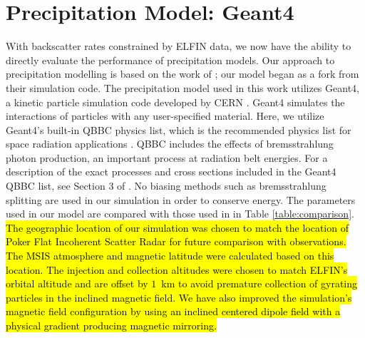 \documentclass[draft]{agujournal2019}
\begin{document}
\section{Precipitation Model: Geant4}
With backscatter rates constrained by ELFIN data, we now have the ability to directly evaluate the performance of precipitation models. Our approach to precipitation modelling is based on the work of ; our model began as a fork from their simulation code. The precipitation model used in this work utilizes Geant4, a kinetic particle simulation code developed by CERN \cite{agostinelli2003}. Geant4 simulates the interactions of particles with any user-specified material. Here, we utilize Geant4's built-in QBBC physics list, which is the recommended physics list for space radiation applications \cite{ivantchenko2012}. QBBC includes the effects of bremsstrahlung photon production, an important process at radiation belt energies. For a description of the exact processes and cross sections included in the Geant4 QBBC list, see Section 3 of . No biasing methods such as bremsstrahlung splitting are used in our simulation in order to conserve energy. The parameters used in our model are compared with those used in  in Table \ref{table:comparison}. \hl{The geographic location of our simulation was chosen to match the location of Poker Flat Incoherent Scatter Radar for future comparison with observations. The MSIS atmosphere and magnetic latitude were calculated based on this location. The injection and collection altitudes were chosen to match ELFIN's orbital altitude and are offset by $1$~km to avoid premature collection of gyrating particles in the inclined magnetic field. We have also improved the simulation's magnetic field configuration by using an inclined centered dipole field with a physical gradient producing magnetic mirroring.}
\end{document}
